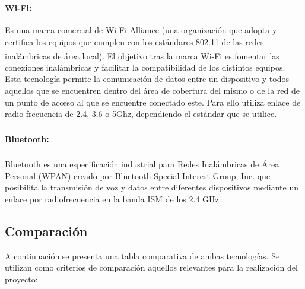                 \paragraph{Wi-Fi\textsuperscript{\textregistered}:} Es una marca comercial de Wi-Fi Alliance (una organización que adopta y certifica los equipos que cumplen con los estándares 802.11 de las redes inalámbricas de área local). El objetivo tras la marca Wi-Fi\textsuperscript{\textregistered} es fomentar las conexiones inalámbricas y facilitar la compatibilidad de los distintos equipos. Esta tecnología permite la comunicación de datos entre un dispositivo y todos aquellos que se encuentren dentro del área de cobertura del mismo o de la red de un punto de acceso al que se encuentre conectado este. Para ello utiliza enlace de radio frecuencia de 2.4, 3.6 o 5Ghz, dependiendo el estándar que se utilice.
                \paragraph{Bluetooth\textsuperscript{\textregistered}:} Bluetooth\textsuperscript{\textregistered} es una especificación industrial para Redes Inalámbricas de Área Personal (WPAN) creado por Bluetooth Special Interest Group, Inc. que posibilita la transmisión de voz y datos entre diferentes dispositivos mediante un enlace por radiofrecuencia en la banda ISM de los 2.4 GHz.
                
        \subsection{Comparación}
            \par A continuación se presenta una tabla comparativa de ambas tecnologías. Se utilizan como criterios de comparación aquellos relevantes para la realización del proyecto:
            
